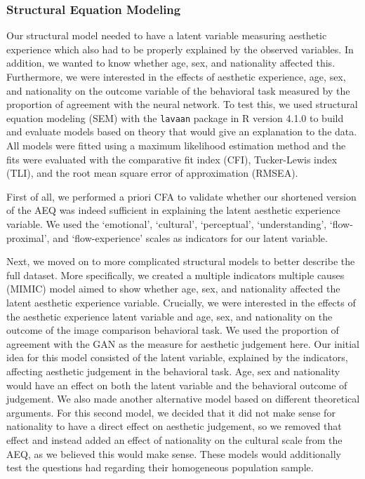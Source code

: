 \documentclass[../main.tex]{subfiles}
\begin{document}
	\subsubsection{Structural Equation Modeling}
	Our structural model needed to have a latent variable measuring aesthetic experience which also had to be properly explained by the observed variables. In addition, we wanted to know whether age, sex, and nationality affected this. Furthermore, we were interested in the effects of aesthetic experience, age, sex, and nationality on the outcome variable of the behavioral task measured by the proportion of agreement with the neural network. To test this, we used structural equation modeling (SEM) with the \texttt{lavaan} package \parencite{rosseel2012lavaan} in R version 4.1.0 \parencite{rcoreteamlanguage} to build and evaluate models based on theory that would give an explanation to the data. All models were fitted using a maximum likelihood estimation method and the fits were evaluated with the comparative fit index (CFI), Tucker-Lewis index (TLI), and the root mean square error of approximation (RMSEA).
	
	First of all, we performed a priori CFA to validate whether our shortened version of the AEQ was indeed sufficient in explaining the latent aesthetic experience variable. We used the `emotional', `cultural', `perceptual', `understanding', `flow-proximal', and `flow-experience' scales as indicators for our latent variable. 
	
	Next, we moved on to more complicated structural models to better describe the full dataset. More specifically, we created a multiple indicators multiple causes (MIMIC) model aimed to show whether age, sex, and nationality affected the latent aesthetic experience variable. Crucially, we were interested in the effects of the aesthetic experience latent variable and age, sex, and nationality on the outcome of the image comparison behavioral task. We used the proportion of agreement with the GAN as the measure for aesthetic judgement here. Our initial idea for this model consisted of the latent variable, explained by the indicators, affecting aesthetic judgement in the behavioral task. Age, sex and nationality would have an effect on both the latent variable and the behavioral outcome of judgement. We also made another alternative model based on different theoretical arguments. For this second model, we decided that it did not make sense for nationality to have a direct effect on aesthetic judgement, so we removed that effect and instead added an effect of nationality on the cultural scale from the AEQ, as we believed this would make sense. These models would additionally test the questions \textcite{wanzerExperiencingFlowViewing2020} had regarding their homogeneous population sample. 
	
\end{document}
